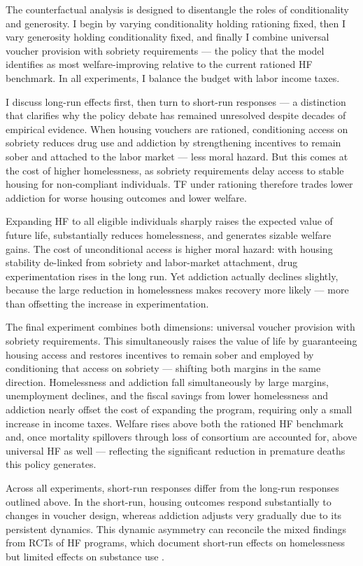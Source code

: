 \documentclass[parskip=full]{article}
\theoremstyle{plain}
\theoremstyle{definition}
\theoremstyle{remark}
\begin{document}
The counterfactual analysis is designed to disentangle the roles of conditionality and generosity. I begin by varying conditionality holding rationing fixed, then I vary generosity holding conditionality fixed, and finally I combine universal voucher provision with sobriety requirements — the policy that the model identifies as most welfare-improving relative to the current rationed HF benchmark. In all experiments, I balance the budget with labor income taxes.

I discuss long-run effects first, then turn to short-run responses — a distinction that clarifies why the policy debate has remained unresolved despite decades of empirical evidence. When housing vouchers are rationed, conditioning access on sobriety reduces drug use and addiction by strengthening incentives to remain sober and attached to the labor market — less moral hazard. But this comes at the cost of higher homelessness, as sobriety requirements delay access to stable housing for non-compliant individuals. TF under rationing therefore trades lower addiction for worse housing outcomes and lower welfare.

Expanding HF to all eligible individuals sharply raises the expected value of future life, substantially reduces homelessness, and generates sizable welfare gains. The cost of unconditional access is higher moral hazard: with housing stability de-linked from sobriety and labor-market attachment, drug experimentation rises in the long run. Yet addiction actually declines slightly, because the large reduction in homelessness makes recovery more likely — more than offsetting the increase in experimentation.

The final experiment combines both dimensions: universal voucher provision with sobriety requirements. This simultaneously raises the value of life by guaranteeing housing access and restores incentives to remain sober and employed by conditioning that access on sobriety — shifting both margins in the same direction. Homelessness and addiction fall simultaneously by large margins, unemployment declines, and the fiscal savings from lower homelessness and addiction nearly offset the cost of expanding the program, requiring only a small increase in income taxes. Welfare rises above both the rationed HF benchmark and, once mortality spillovers through loss of consortium are accounted for, above universal HF as well — reflecting the significant reduction in premature deaths this policy generates.

Across all experiments, short-run responses differ from the long-run responses outlined above. In the short-run, housing outcomes respond substantially to changes in voucher design, whereas addiction adjusts very gradually due to its persistent dynamics. This dynamic asymmetry can reconcile the mixed findings from RCTs of HF programs, which document short-run effects on homelessness but limited effects on substance use \citep{tsemberis2004housing,larimer2009housing,padgett2006housing,goering2014national,aubry2016housing}.
\end{document}
